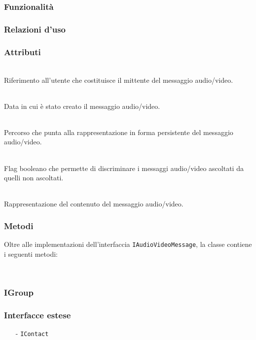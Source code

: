\subsubsection*{Funzionalità}

\subsubsection*{Relazioni d'uso}

\subsubsection*{Attributi}
\begin{description}
  \item{}\\
Riferimento all'utente che costituisce il mittente del messaggio audio/video.
  \item{}\\
Data in cui è stato creato il messaggio audio/video.
  \item{}\\
Percorso che punta alla rappresentazione in forma persistente del messaggio audio/video.
  \item{}\\
Flag booleano che permette di discriminare i messaggi audio/video ascoltati da quelli non ascoltati.
  \item{}\\
Rappresentazione del contenuto del messaggio audio/video.
\end{description}

\subsubsection*{Metodi}
Oltre alle implementazioni dell'interfaccia \texttt{IAudioVideoMessage}, la classe contiene i seguenti metodi:
\begin{description}
  \item{}\\
\end{description}

\subsubsection{IGroup}\label{sec:igroup}
\subsubsection*{Interfacce estese}
\begin{itemize}[noitemsep,nolistsep]
  \item[-] \texttt{IContact}
\end{itemize}

